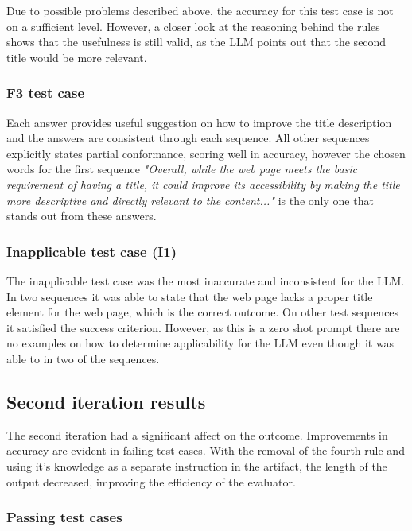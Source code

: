 Due to possible problems described above, the accuracy for this test case is not on a sufficient level. However, a closer look at the reasoning behind the rules shows that the usefulness is still valid, as the LLM points out that the second title would be more relevant.

\subsubsection{F3 test case}

Each answer provides useful suggestion on how to improve the title description and the answers are consistent through each sequence. All other sequences explicitly states partial conformance, scoring well in accuracy, however the chosen words for the first sequence \textit{"Overall, while the web page meets the basic requirement of having a title, it could improve its accessibility by making the title more descriptive and directly relevant to the content..."} is the only one that stands out from these answers. 

\subsubsection{Inapplicable test case (I1)}

The inapplicable test case was the most inaccurate and inconsistent for the LLM. In two sequences it was able to state that the web page lacks a proper title element for the web page, which is the correct outcome. On other test sequences it satisfied the success criterion. However, as this is a zero shot prompt there are no examples on how to determine applicability for the LLM even though it was able to in two of the sequences.


\subsection{Second iteration results}

The second iteration had a significant affect on the outcome. Improvements in accuracy are evident in failing test cases. With the removal of the fourth rule and using it's knowledge as a separate instruction in the artifact, the length of the output decreased, improving the efficiency of the evaluator.

\subsubsection{Passing test cases}

